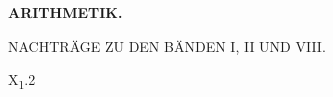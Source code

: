 \NoSourceHead
{}
\vspace*{.25\textheight}
\begin{center}\Large\bfseries ARITHMETIK.\end{center}
\bigskip
\begin{center}\large NACHTRÄGE ZU DEN BÄNDEN I, II UND VIII.\end{center}
\vfill\noindent X\textsubscript{1}.\hfill 2
\clearpage
